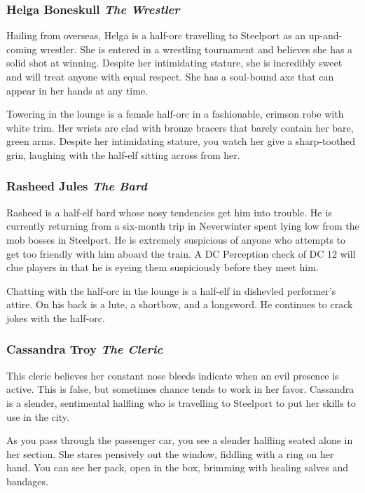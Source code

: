 \documentclass[letterpaper,10pt,twoside,twocolumn,openany]{dndbook}
\begin{document}
\subsubsection{Helga Boneskull \textit{The Wrestler}}
Hailing from overseas, Helga is a half-orc travelling to Steelport as an up-and-coming wrestler.  She is entered in a wrestling tournament and believes she has a solid shot at winning. Despite her intimidating stature, she is incredibly sweet and will treat anyone with equal respect.  She has a soul-bound axe that can appear in her hands at any time.

\begin{quotebox}
Towering in the lounge is a female half-orc in a fashionable, crimson robe with white trim.  Her wrists are clad with bronze bracers that barely contain her bare, green arms.  Despite her intimidating stature, you watch her give a sharp-toothed grin, laughing with the half-elf sitting across from her.
\end{quotebox}

\subsubsection{Rasheed Jules \textit{The Bard}}
Rasheed is a half-elf bard whose nosy tendencies get him into trouble.  He is currently returning from a six-month trip in Neverwinter spent lying low from the mob bosses in Steelport.  He is extremely suspicious of anyone who attempts to get too friendly with him aboard the train.  A DC Perception check of DC 12 will clue players in that he is eyeing them suspiciously before they meet him.

\begin{quotebox}
Chatting with the half-orc in the lounge is a half-elf in dishevled performer's attire.  On his back is a lute, a shortbow, and a longsword.  He continues to crack jokes with the half-orc.
\end{quotebox}

\subsubsection{Cassandra Troy \textit{The Cleric}}
This cleric believes her constant nose bleeds indicate when an evil presence is active. This is false, but sometimes chance tends to work in her favor. Cassandra is a slender, sentimental halfling who is travelling to Steelport to put her skills to use in the city.

\begin{quotebox}
As you pass through the passenger car, you see a slender halfling seated alone in her section.  She stares pensively out the window, fiddling with a ring on her hand.  You can see her pack, open in the box, brimming with healing salves and bandages.
\end{quotebox}
 
\end{document}

